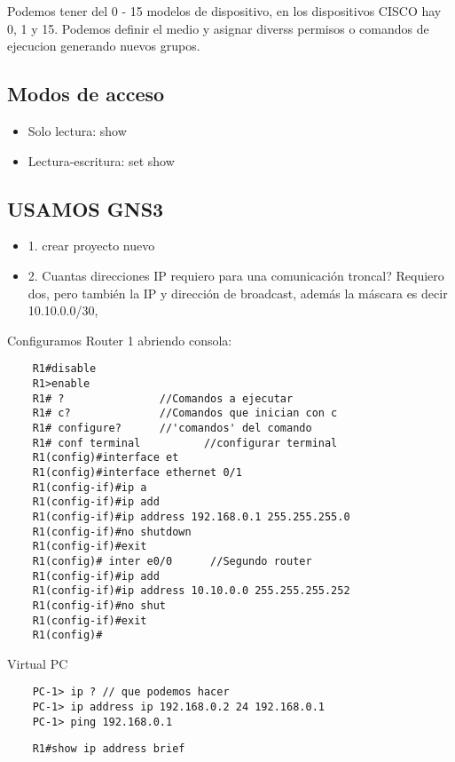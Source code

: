 Podemos tener del 0 - 15 modelos de dispositivo, en los dispositivos CISCO hay 0, 1 y 15. Podemos definir el medio y asignar diverss permisos o comandos de ejecucion generando nuevos grupos.

\subsection{Modos de acceso}
\begin{itemize}
    \item {Solo lectura: show}
    \item {Lectura-escritura: set show}
\end{itemize}

\subsection{USAMOS GNS3}
\begin{itemize}
    \item {1. crear proyecto nuevo}
    \item {2. Cuantas direcciones IP requiero para una comunicación troncal? Requiero dos, pero también la IP y dirección de broadcast, además la máscara es decir 10.10.0.0/30, }
\end{itemize}
Configuramos Router 1 abriendo consola:
\begin{lstlisting}
    R1#disable
    R1>enable 
    R1# ?               //Comandos a ejecutar
    R1# c?              //Comandos que inician con c
    R1# configure?      //'comandos' del comando
    R1# conf terminal          //configurar terminal 
    R1(config)#interface et
    R1(config)#interface ethernet 0/1
    R1(config-if)#ip a
    R1(config-if)#ip add
    R1(config-if)#ip address 192.168.0.1 255.255.255.0
    R1(config-if)#no shutdown
    R1(config-if)#exit 
    R1(config)# inter e0/0      //Segundo router
    R1(config-if)#ip add 
    R1(config-if)#ip address 10.10.0.0 255.255.255.252
    R1(config-if)#no shut 
    R1(config-if)#exit
    R1(config)#
\end{lstlisting}

Virtual PC
\begin{lstlisting}
    PC-1> ip ? // que podemos hacer 
    PC-1> ip address ip 192.168.0.2 24 192.168.0.1
    PC-1> ping 192.168.0.1
\end{lstlisting}

\begin{lstlisting}
    R1#show ip address brief
\end{lstlisting}

